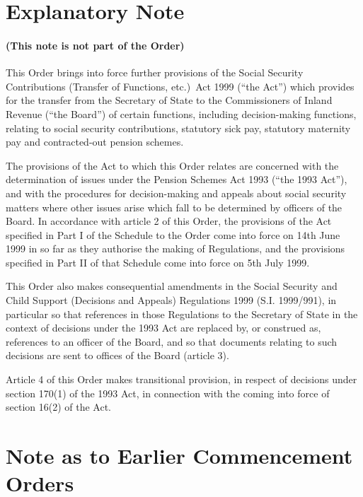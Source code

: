 \documentclass[12pt,a4paper]{article}
\begin{document}
\part{Explanatory Note}

\renewcommand\parthead{— Explanatory Note}

\subsection*{(This note is not part of the Order)}

This Order brings into force further provisions of the Social Security Contributions (Transfer of Functions, etc.)\ Act 1999 (“the Act”) which provides for the transfer from the Secretary of State to the Commissioners of Inland Revenue (“the Board”) of certain functions, including decision-making functions, relating to social security contributions, statutory sick pay, statutory maternity pay and contracted-out pension schemes.

The provisions of the Act to which this Order relates are concerned with the determination of issues under the Pension Schemes Act 1993 (“the 1993 Act”), and with the procedures for decision-making and appeals about social security matters where other issues arise which fall to be determined by officers of the Board. In accordance with article 2 of this Order, the provisions of the Act specified in Part I of the Schedule to the Order come into force on 14th June 1999 in so far as they authorise the making of Regulations, and the provisions specified in Part II of that Schedule come into force on 5th July 1999.

This Order also makes consequential amendments in the Social Security and Child Support (Decisions and Appeals) Regulations 1999 (S.I. 1999/991), in particular so that references in those Regulations to the Secretary of State in the context of decisions under the 1993 Act are replaced by, or construed as, references to an officer of the Board, and so that documents relating to such decisions are sent to offices of the Board (article 3).

Article 4 of this Order makes transitional provision, in respect of decisions under section 170(1) of the 1993 Act, in connection with the coming into force of section 16(2) of the Act. 

\part{Note as to Earlier Commencement Orders}
\end{document}
